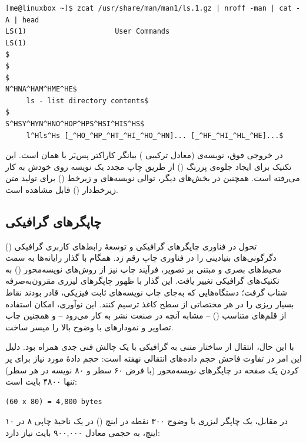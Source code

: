 \begin{latin}
\begin{lstlisting}
[me@linuxbox ~]$ zcat /usr/share/man/man1/ls.1.gz | nroff -man | cat -A | head
LS(1)                     User Commands                           LS(1)
$
$
$
N^HNA^HAM^HME^HE$
     ls - list directory contents$
$
S^HSY^HYN^HNO^HOP^HPS^HSI^HIS^HS$
     l^Hls^Hs [_^HO_^HP_^HT_^HI_^HO_^HN]... [_^HF_^HI_^HL_^HE]...$
\end{lstlisting}
\end{latin}

در خروجی فوق، نویسه‌ی  (معادل ترکیبی ) بیانگر کاراکتر پس‌بَر یا همان  است. این تکنیک برای ایجاد جلوه‌ی پررنگ () از طریق چاپ مجدد یک نویسه روی خودش به کار می‌رفته است. همچنین در بخش‌های دیگر، توالی نویسه‌های  و زیرخط () برای تولید متن زیرخط‌دار () قابل مشاهده است.

\subsection{چاپگرهای گرافیکی}

تحول در فناوری چاپگرهای گرافیکی و توسعهٔ رابط‌های کاربری گرافیکی () دگرگونی‌های بنیادینی را در فناوری چاپ رقم زد. همگام با گذار رایانه‌ها به سمت محیط‌های بصری و مبتنی بر تصویر، فرآیند چاپ نیز از روش‌های نویسه‌محور () به تکنیک‌های گرافیکی تغییر یافت. این گذار با ظهور چاپگرهای لیزری مقرون‌به‌صرفه شتاب گرفت؛ دستگاه‌هایی که به‌جای چاپ نویسه‌های ثابت فیزیکی، قادر بودند نقاط بسیار ریزی را در هر مختصاتی از سطح کاغذ ترسیم کنند. این نوآوری، امکان استفاده از قلم‌های متناسب () – مشابه آنچه در صنعت نشر به کار می‌رود – و همچنین چاپ تصاویر و نمودارهای با وضوح بالا را میسر ساخت.

با این حال، انتقال از ساختار متنی به گرافیکی با یک چالش فنی جدی همراه بود. دلیل این امر در تفاوت فاحش حجم داده‌های انتقالی نهفته است: حجم دادهٔ مورد نیاز برای پر کردن یک صفحه در چاپگرهای نویسه‌محور (با فرض ۶۰ سطر و ۸۰ نویسه در هر سطر) تنها ۴۸۰۰ بایت است:

\begin{latin}
\begin{lstlisting}
(60 x 80) = 4,800 bytes
\end{lstlisting}
\end{latin}

در مقابل، یک چاپگر لیزری با وضوح ۳۰۰ نقطه در اینچ () در یک ناحیهٔ چاپی ۸ در ۱۰ اینچ، به حجمی معادل ۹۰۰,۰۰۰ بایت نیاز دارد:


